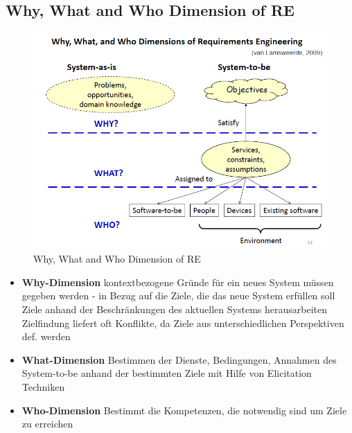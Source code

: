 \subsection{Why, What and Who Dimension of RE}
\begin{figure}[h]
	\centering
	\includegraphics[scale=0.5]{img/re_dimensions.png}
	\caption{Why, What and Who Dimension of RE}
\end{figure}
\begin{itemize}
	\item \textbf{Why-Dimension} kontextbezogene Gründe für ein neues System müssen gegeben werden - in Bezug auf die Ziele, die das neue System erfüllen soll\\
	Ziele anhand der Beschränkungen des aktuellen Systems herausarbeiten\\
	Zielfindung liefert oft Konflikte, da Ziele aus unterschiedlichen Perspektiven def. werden
	
	\item \textbf{What-Dimension} Bestimmen der Dienste, Bedingungen, Annahmen des System-to-be anhand der bestimmten Ziele mit Hilfe von Elicitation Techniken
	
	\item \textbf{Who-Dimension} Bestimmt die Kompetenzen, die notwendig sind um Ziele zu erreichen
\end{itemize}
\newpage
